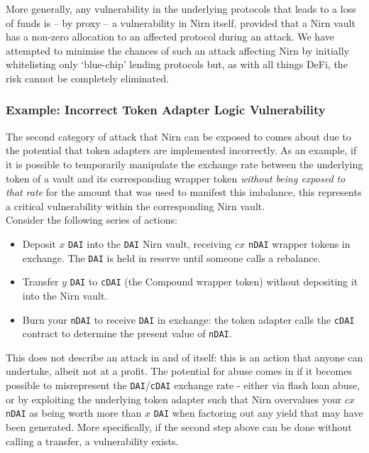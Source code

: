 \documentclass{article}
\begin{document}
\noindent
More generally, any vulnerability in the underlying protocols that leads to a loss of funds is -- by proxy -- a vulnerability in Nirn itself, provided that a Nirn vault has a non-zero allocation to an affected protocol during an attack. We have attempted to minimise the chances of such an attack affecting Nirn by initially whitelisting only `blue-chip' lending protocols but, as with all things DeFi, the risk cannot be completely eliminated.

\subsubsection*{Example: Incorrect Token Adapter Logic Vulnerability}

\noindent
The second category of attack that Nirn can be exposed to comes about due to the potential that token adapters are implemented incorrectly. As an example, if it is possible to temporarily manipulate the exchange rate between the underlying token of a vault and its corresponding wrapper token \textit{without being exposed to that rate} for the amount that was used to manifest this imbalance, this represents a critical vulnerability within the corresponding Nirn vault.\\

\newpage
\noindent
Consider the following series of actions:

\begin{itemize}
    \item Deposit $x$ \texttt{DAI} into the \texttt{DAI} Nirn vault, receiving $cx$ \texttt{nDAI} wrapper tokens in exchange. The \texttt{DAI} is held in reserve until someone calls a rebalance.
    \item Transfer $y$ \texttt{DAI} to \texttt{cDAI} (the Compound wrapper token) without depositing it into the Nirn vault.
    \item Burn your \texttt{nDAI} to receive \texttt{DAI} in exchange: the token adapter calls the \texttt{cDAI} contract to determine the present value of \texttt{nDAI}.
\end{itemize}

\noindent
This does not describe an attack in and of itself: this is an action that anyone can undertake, albeit not at a profit. The potential for abuse comes in if it becomes possible to misrepresent the \texttt{DAI}/\texttt{cDAI} exchange rate - either via flash loan abuse, or by exploiting the underlying token adapter such that Nirn overvalues your $cx$ \texttt{nDAI} as being worth more than $x$ \texttt{DAI} when factoring out any yield that may have been generated. More specifically, if the second step above can be done without calling a transfer, a vulnerability exists.\\
\end{document}
